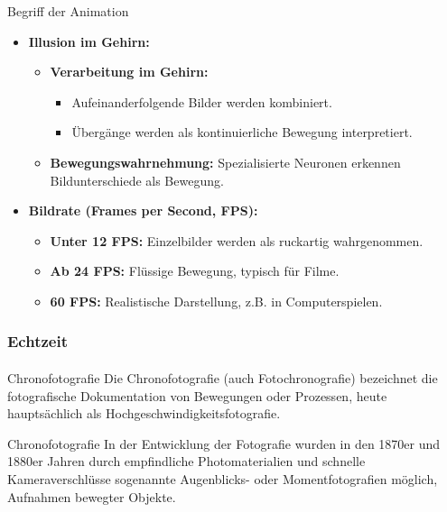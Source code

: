 \documentclass{beamer}
\begin{document}
\begin{frame}{Begriff der Animation}
    \begin{itemize}
      \item \textbf{Illusion im Gehirn:}
      \begin{itemize}
        \item \textbf{Verarbeitung im Gehirn:} 
        \begin{itemize}
          \item Aufeinanderfolgende Bilder werden kombiniert.
          \item Übergänge werden als kontinuierliche Bewegung interpretiert.
        \end{itemize} 
        \item \textbf{Bewegungswahrnehmung:} Spezialisierte Neuronen erkennen Bildunterschiede als Bewegung.
      \end{itemize}
      \item \textbf{Bildrate (Frames per Second, FPS):}
      \begin{itemize}
        \item \textbf{Unter 12 FPS:} Einzelbilder werden als ruckartig wahrgenommen.
        \item \textbf{Ab 24 FPS:} Flüssige Bewegung, typisch für Filme.
        \item \textbf{60 FPS:} Realistische Darstellung, z.B. in Computerspielen.
      \end{itemize}
    \end{itemize}
  \end{frame}
  

  \begin{frame}
    \frametitle{Echtzeit}
\framesubtitle{}
    \begin{block}{Chronofotografie}
        Die Chronofotografie (auch Fotochronografie) bezeichnet die fotografische Dokumentation von Bewegungen oder Prozessen, heute hauptsächlich als Hochgeschwindigkeitsfotografie. 
\end{block}

\begin{block}{Chronofotografie}
    In der Entwicklung der Fotografie wurden in den 1870er und 1880er Jahren durch empfindliche Photomaterialien und schnelle Kameraverschlüsse sogenannte Augenblicks- oder Momentfotografien möglich, Aufnahmen bewegter Objekte.
\end{block}
\end{frame}
\end{document}
